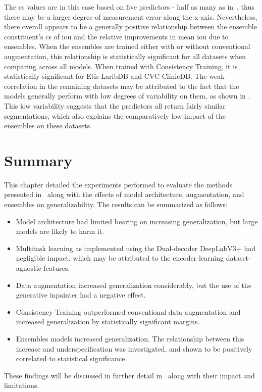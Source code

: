 The \gls{cs} values are in this case based on five predictors - half as many as in~, thus there may be a larger degree of measurement error along the x-axis. Nevertheless, there overall appears to be a generally positive relationship between the ensemble constituent's \gls{cs} of \gls{iou} and the relative improvements in mean \gls{iou} due to ensembles. When the ensembles are trained either with or without conventional augmentation, this relationship is statistically significant for all datasets when comparing across all models. When trained with Consistency Training, it is statistically significant for Etis-LaribDB and CVC-ClinicDB. The weak correlation in the remaining datasets may be attributed to the fact that the models generally perform with low degrees of variability on them, as shown in . This low variability suggests that the predictors all return fairly similar segmentations, which also explains the comparatively low impact of the ensembles on these datasets.  



\section{Summary}
This chapter detailed the experiments performed to evaluate the methods presented in~ along with the effects of model architecture, augmentation, and ensembles on generalizability. The results can be summarized as follows:
\begin{itemize}
    \item Model architecture had limited bearing on increasing generalization, but large models are likely to harm it.
    \item Multitask learning as implemented using the Dual-decoder DeepLabV3+ had negligible impact, which may be attributed to the encoder learning dataset-agnostic features.
    \item Data augmentation increased generalization considerably, but the use of the generative inpainter had a negative effect.
    \item Consistency Training outperformed conventional data augmentation and increased generalization by statistically significant margins.
    \item Ensembles models increased generalization. The relationship between this increase and underspecification was investigated, and shown to be positively correlated to statistical significance. 
\end{itemize}

These findings will be discussed in further detail in~ along with their impact and limitations. 
